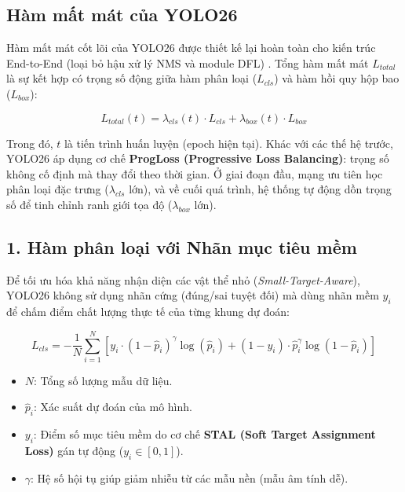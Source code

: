 \subsection{Hàm mất mát của YOLO26}

Hàm mất mát cốt lõi của YOLO26 được thiết kế lại hoàn toàn cho kiến trúc End-to-End (loại bỏ hậu xử lý NMS và module DFL) \cite{Reference18}. Tổng hàm mất mát $L_{total}$ là sự kết hợp có trọng số động giữa hàm phân loại ($L_{cls}$) và hàm hồi quy hộp bao ($L_{box}$):

\begin{equation}
L_{total}(t) = \lambda_{cls}(t) \cdot L_{cls} + \lambda_{box}(t) \cdot L_{box}
\end{equation}

Trong đó, $t$ là tiến trình huấn luyện (epoch hiện tại). Khác với các thế hệ trước, YOLO26 áp dụng cơ chế \textbf{ProgLoss (Progressive Loss Balancing)}: trọng số không cố định mà thay đổi theo thời gian. Ở giai đoạn đầu, mạng ưu tiên học phân loại đặc trưng ($\lambda_{cls}$ lớn), và về cuối quá trình, hệ thống tự động dồn trọng số để tinh chỉnh ranh giới tọa độ ($\lambda_{box}$ lớn)\cite{Reference19}.

\subsection*{1. Hàm phân loại với Nhãn mục tiêu mềm}

Để tối ưu hóa khả năng nhận diện các vật thể nhỏ (\textit{Small-Target-Aware}), YOLO26 không sử dụng nhãn cứng (đúng/sai tuyệt đối) mà dùng nhãn mềm $y_i$ để chấm điểm chất lượng thực tế của từng khung dự đoán:

\begin{equation}
L_{cls} = - \frac{1}{N} \sum_{i=1}^{N} \left[ y_i \cdot (1 - \hat{p}_i)^\gamma \log(\hat{p}_i) + (1 - y_i) \cdot \hat{p}_i^\gamma \log(1 - \hat{p}_i) \right]
\end{equation}

\begin{itemize}
    \item $N$: Tổng số lượng mẫu dữ liệu.
    \item $\hat{p}_i$: Xác suất dự đoán của mô hình.
    \item $y_i$: Điểm số mục tiêu mềm do cơ chế \textbf{STAL (Soft Target Assignment Loss)} gán tự động ($y_i \in [0, 1]$).
    \item $\gamma$: Hệ số hội tụ giúp giảm nhiễu từ các mẫu nền (mẫu âm tính dễ).
\end{itemize}

